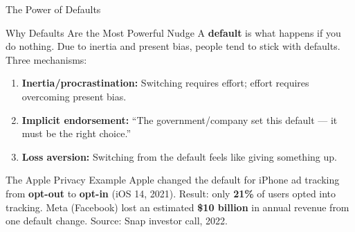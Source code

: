 \documentclass[aspectratio=169]{beamer}
\begin{document}
\begin{frame}{The Power of Defaults}
\begin{block}{Why Defaults Are the Most Powerful Nudge}
A \textbf{default} is what happens if you do nothing. Due to inertia and present bias, people tend to stick with defaults. Three mechanisms:
\begin{enumerate}
  \item \textbf{Inertia/procrastination:} Switching requires effort; effort requires overcoming present bias.
  \item \textbf{Implicit endorsement:} ``The government/company set this default --- it must be the right choice.''
  \item \textbf{Loss aversion:} Switching from the default feels like giving something up.
\end{enumerate}
\end{block}
\begin{exampleblock}{The Apple Privacy Example}
Apple changed the default for iPhone ad tracking from \textbf{opt-out} to \textbf{opt-in} (iOS 14, 2021). Result: only \textbf{21\%} of users opted into tracking. Meta (Facebook) lost an estimated \textbf{\$10 billion} in annual revenue from one default change. Source: Snap investor call, 2022.
\end{exampleblock}
\end{frame}
\end{document}
